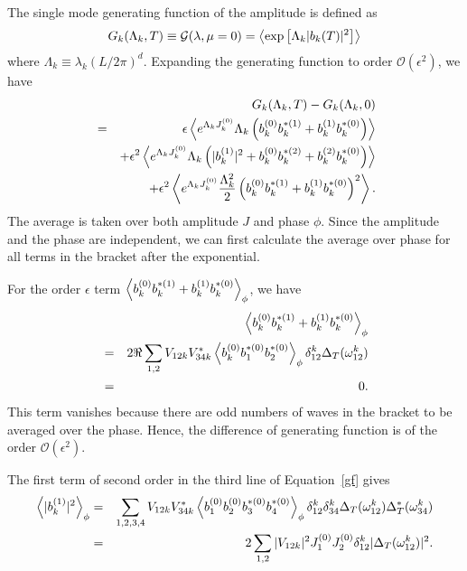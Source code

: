 The single mode generating function of the amplitude is defined as
\begin{equation}
	G_k(\Lambda_k,T)\equiv \mathcal{G}(\lambda,\mu=0)= \left< \exp\left[\Lambda_k |b_k(T)|^2 \right]\right>
\end{equation}
where $\Lambda_k \equiv\lambda_k (L/2\pi)^d$.
Expanding the generating function to order $\mathcal{O}(\epsilon^2)$, we have
\begin{eqnarray}\label{gf}
	&& G_k(\Lambda_k,T)-G_{k}(\Lambda_k,0) \nonumber\\
	&=&\epsilon \left<  e^{\Lambda_k J_k^{(0)}} \Lambda_k \left(b_k^{(0)}b_k^{*(1)}+b_k^{(1)}b_k^{*(0)} \right)\right>\nonumber\\
	&&+\epsilon^2\left<  e^{\Lambda_k J_k^{(0)}} \Lambda_k \left(|{b_k^{(1)}}|^2+b_k^{(0)}b_k^{*(2)}+b_k^{(2)}b_k^{*(0)}\right)\right>\nonumber\\
	&&+\epsilon^2\left<  e^{\Lambda_k J_k^{(0)}} \frac{ \Lambda_k^2}{2} \left(b_k^{(0)}b_k^{*(1)}+b_k^{(1)}b_k^{*(0)} \right)^2\right>.
\end{eqnarray}
The average is taken over both amplitude $J$ and phase $\phi$.
Since the amplitude and the phase are independent, we can first calculate the average over phase for all terms in the bracket after the exponential.

For the order $\epsilon$ term $\left< b_k^{(0)}b_k^{*(1)}+b_k^{(1)}b_k^{*(0)}\right>_\phi$, we have
\begin{eqnarray}
	&&\left< b_k^{(0)}b_k^{*(1)}+b_k^{(1)}b_k^{*(0)}\right>_\phi \nonumber \\
	&=&2\Re\sum\limits_{1,2}V_{12k}V^*_{34k}\left< b_k^{(0)}b_1^{*(0)}b_2^{*(0)}\right>_\phi \delta_{12}^k \Delta_T(\omega_{12}^{k})\nonumber\\
	&=&0.
\end{eqnarray}
This term vanishes because there are odd numbers of waves in the bracket to be averaged over the phase.
Hence, the difference of generating function is of the order $\mathcal{O}(\epsilon^2)$.

The first term of second order in the third line of Equation~\ref{gf} gives
\begin{eqnarray}
		\left< |b_k^{(1)}|^2\right>_\phi &=& \sum\limits_{1,2,3,4}V_{12k}V^*_{34k}\left< b_1^{(0)}b_2^{(0)}b_3^{*(0)}b_4^{*(0)}\right>_\phi \delta_{12}^k\delta_{34}^k\Delta_T(\omega_{12}^{k})\Delta^*_T(\omega_{34}^{k})\nonumber\\
		&=& 2\sum\limits_{1,2}|V_{12k}|^2 J_{1}^{(0)}J_{2}^{(0)}\delta_{12}^k|\Delta_T(\omega_{12}^{k})|^2.
\end{eqnarray}

